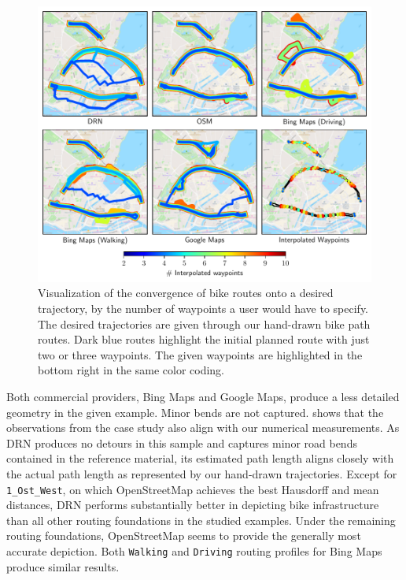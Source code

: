 \begin{figure}[t]
\centering 
\includegraphics[width=\linewidth]{images/routing-convergence-process.pdf}
\caption{Visualization of the convergence of bike routes onto a desired trajectory, by the number of waypoints a user would have to specify. The desired trajectories are given through our hand-drawn bike path routes. Dark blue routes highlight the initial planned route with just two or three waypoints. The given waypoints are highlighted in the bottom right in the same color coding.}
\label{fig:routing-convergence-process}
\end{figure}

Both commercial providers, Bing Maps and Google Maps, produce a less detailed geometry in the given example. Minor bends are not captured.  shows that the observations from the case study also align with our numerical measurements. As DRN produces no detours in this sample and captures minor road bends contained in the reference material, its estimated path length aligns closely with the actual path length as represented by our hand-drawn trajectories. Except for \texttt{1\_Ost\_West}, on which OpenStreetMap achieves the best Hausdorff and mean distances, DRN performs substantially better in depicting bike infrastructure than all other routing foundations in the studied examples. Under the remaining routing foundations, OpenStreetMap seems to provide the generally most accurate depiction. Both \texttt{Walking} and \texttt{Driving} routing profiles for Bing Maps produce similar results.

